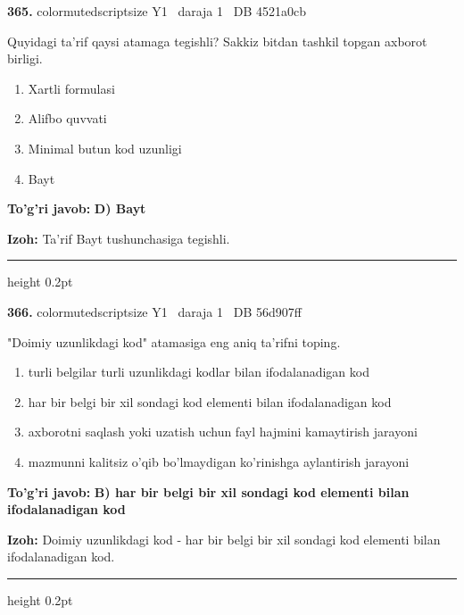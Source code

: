 \documentclass[10pt,a4paper,oneside]{article}
\begin{document}
\noindent\textbf{\color{ink}365.}  {color{muted}scriptsize Y1 \textbullet\ daraja 1 \textbullet\ DB 4521a0cb}
\par
Quyidagi ta'rif qaysi atamaga tegishli? Sakkiz bitdan tashkil topgan axborot birligi.
\begin{enumerate}[label=\Alph*),leftmargin=9mm]
\item Xartli formulasi
\item Alifbo quvvati
\item Minimal butun kod uzunligi
\item Bayt
\end{enumerate}
\begin{tcolorbox}[enhanced,breakable,colback=teal!4,colframe=teal!50!black,boxrule=0.5pt,arc=1.1mm,left=3mm,right=3mm,top=1.7mm,bottom=1.7mm,before skip=2mm,after skip=2mm]
\textbf{\color{teal}To'g'ri javob:} \textbf{D) Bayt}
\par\smallskip
\textbf{Izoh:} Ta'rif Bayt tushunchasiga tegishli.
\end{tcolorbox}
\vspace{2mm}\hrule height 0.2pt \vspace{3mm}

\noindent\textbf{\color{ink}366.}  {color{muted}scriptsize Y1 \textbullet\ daraja 1 \textbullet\ DB 56d907ff}
\par
"Doimiy uzunlikdagi kod" atamasiga eng aniq ta'rifni toping.
\begin{enumerate}[label=\Alph*),leftmargin=9mm]
\item turli belgilar turli uzunlikdagi kodlar bilan ifodalanadigan kod
\item har bir belgi bir xil sondagi kod elementi bilan ifodalanadigan kod
\item axborotni saqlash yoki uzatish uchun fayl hajmini kamaytirish jarayoni
\item mazmunni kalitsiz o'qib bo'lmaydigan ko'rinishga aylantirish jarayoni
\end{enumerate}
\begin{tcolorbox}[enhanced,breakable,colback=teal!4,colframe=teal!50!black,boxrule=0.5pt,arc=1.1mm,left=3mm,right=3mm,top=1.7mm,bottom=1.7mm,before skip=2mm,after skip=2mm]
\textbf{\color{teal}To'g'ri javob:} \textbf{B) har bir belgi bir xil sondagi kod elementi bilan ifodalanadigan kod}
\par\smallskip
\textbf{Izoh:} Doimiy uzunlikdagi kod - har bir belgi bir xil sondagi kod elementi bilan ifodalanadigan kod.
\end{tcolorbox}
\vspace{2mm}\hrule height 0.2pt \vspace{3mm}
\end{document}
